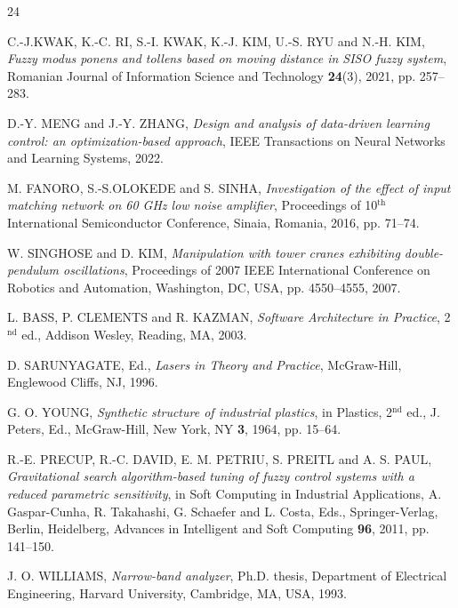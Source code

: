 \documentclass[twoside]{romjist}
\begin{document}
\begin{thebibliography}{24}

	C.-J.\uppercase{Kwak}, K.-C. \uppercase{Ri}, S.-I. \uppercase{Kwak}, K.-J. \uppercase{Kim}, U.-S. \uppercase{Ryu} and N.-H. \uppercase{Kim}, \textit{Fuzzy modus ponens and tollens based on moving distance in SISO fuzzy system}, Romanian Journal of Information Science and Technology \textbf{24}(3), 2021, pp. 257--283.

	D.-Y. \uppercase{Meng} and J.-Y. \uppercase{Zhang}, \textit{Design and analysis of data-driven learning control: an optimization-based approach}, IEEE Transactions on Neural Networks and Learning Systems,  2022.

	M. \uppercase{Fanoro}, S.-S.\uppercase{Olokede} and S. \uppercase{Sinha}, \textit{Investigation of the effect of input matching network on 60 GHz low noise amplifier}, Proceedings of 10$^{\textrm{th}}$ International Semiconductor Conference, Sinaia, Romania, 2016, pp. 71--74.

	W. \uppercase{Singhose} and D. \uppercase{Kim}, \textit{Manipulation with tower cranes exhibiting double-pendulum oscillations}, Proceedings of 2007 IEEE International Conference on Robotics and Automation, Washington, DC, USA, pp. 4550--4555, 2007.

	L. \uppercase{Bass}, P. \uppercase{Clements} and R. \uppercase{Kazman}, \textit{Software Architecture in Practice}, 2$^{\textrm{nd}}$ ed., Addison Wesley, Reading, MA, 2003.

	D. \uppercase{Sarunyagate}, Ed., \textit{Lasers in Theory and Practice}, McGraw-Hill, Englewood Cliffs, NJ, 1996.

	G. O. \uppercase{Young}, \textit{Synthetic structure of industrial plastics}, in Plastics, 2$^{\textrm{nd}}$ ed., J. Peters, Ed., McGraw-Hill, New York, NY \textbf{3}, 1964, pp. 15--64.

	R.-E. \uppercase{Precup}, R.-C. \uppercase{David}, E. M. \uppercase{Petriu}, S. \uppercase{Preitl} and A. S. \uppercase{Paul}, \textit{Gravitational search algorithm-based tuning of fuzzy control systems with a reduced parametric sensitivity}, in Soft Computing in Industrial Applications, A. Gaspar-Cunha, R. Takahashi, G. Schaefer and L. Costa, Eds., Springer-Verlag, Berlin, Heidelberg, Advances in Intelligent and Soft Computing  \textbf{96}, 2011, pp. 141--150.

	J. O. \uppercase{Williams}, \textit{Narrow-band analyzer}, Ph.D. thesis, Department of Electrical Engineering, Harvard University, Cambridge, MA, USA, 1993.


\end{thebibliography}
\end{document}
